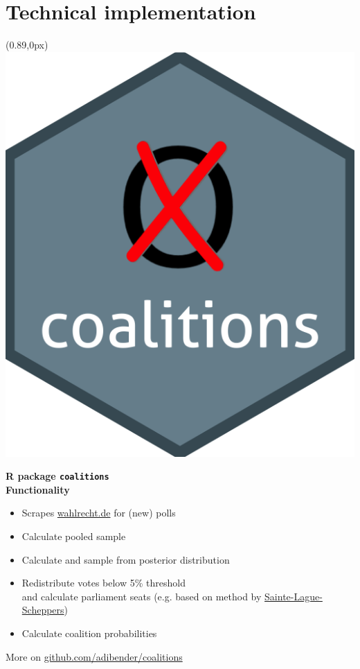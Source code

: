 \documentclass[10pt,xcolor=dvipsnames,t,headinclude,headsepline=1.5cm,usepdftitle=false]{beamer}
\begin{document}
\section{Technical implementation}

\begin{frame}[fragile]
\begin{textblock*}{1.25cm}(0.89\textwidth,0px)
\includegraphics[width=1\textwidth]{figures/coalitions_hex}
\end{textblock*}
\vspace{10px}
\textbf{R package \texttt{coalitions}}
\\[1cm]
\textbf{Functionality}
\begin{itemize}
  \item Scrapes \href{https://www.wahlrecht.de/}{wahlrecht.de} for (new) polls
  \item Calculate pooled sample
  \item Calculate and sample from posterior distribution
  \item Redistribute votes below 5\% threshold \\[0.1cm]
and calculate parliament seats 
{\footnotesize (e.g. based on method by \href{http://www.wahlrecht.de/verfahren/rangmasszahlen.html}{Sainte-Lague-Scheppers})}
  \item Calculate coalition probabilities
\end{itemize}
\bigskip
More on \href{https://github.com/adibender/coalitions/}{github.com/adibender/coalitions}
\end{frame}
\end{document}
